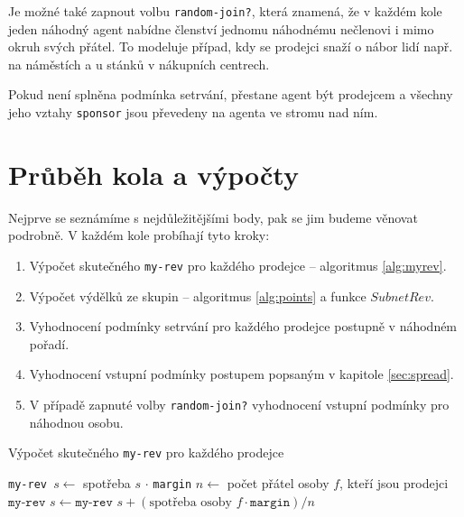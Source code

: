 \documentclass[a4wide,12pt]{report}
\begin{document}
Je možné také zapnout volbu \texttt{random-join?}, která znamená, že v každém kole jeden náhodný agent nabídne členství jednomu náhodnému nečlenovi i mimo okruh svých přátel. To modeluje případ, kdy se prodejci snaží o nábor lidí např. na náměstích a u stánků v nákupních centrech.
 
Pokud není splněna podmínka setrvání, přestane agent být prodejcem a všechny jeho vztahy \texttt{sponsor} jsou převedeny na agenta ve stromu nad ním.
\section{Průběh kola a výpočty}
Nejprve se seznámíme s nejdůležitějšími body, pak se jim budeme věnovat podrobně. V každém kole probíhají tyto kroky:
\begin{enumerate}
\item Výpočet skutečného \texttt{my-rev} pro každého prodejce -- algoritmus \ref{alg:myrev}.
\item Výpočet výdělků ze skupin -- algoritmus \ref{alg:points} a funkce $SubnetRev$.
\item Vyhodnocení podmínky setrvání pro každého prodejce postupně v náhodném pořadí.
\item Vyhodnocení vstupní podmínky postupem popsaným v kapitole \ref{sec:spread}.
\item V případě zapnuté volby \texttt{random-join?} vyhodnocení vstupní podmínky pro náhodnou osobu.
\end{enumerate}
\begin{algorithm}
\caption{Výpočet skutečného \texttt{my-rev} pro každého prodejce}
\label{alg:myrev}
\begin{algorithmic}[]

  \STATE \texttt{my-rev }$s\gets$ spotřeba $s$ $\cdot$ \texttt{margin}
  \STATE{}
    \STATE $n\gets $ počet přátel osoby $f$, kteří jsou prodejci
    \STATE $\texttt{my-rev }s\gets\texttt{my-rev }s+(\text{spotřeba osoby }f \cdot \texttt{margin}) / n$
  \ENDFOR
\ENDFOR
\end{algorithmic}
\end{algorithm}
\end{document}
